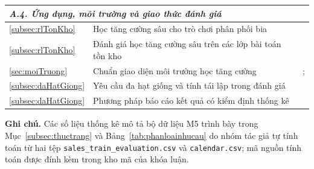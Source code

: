 \begin{longtable}{|p{}|p{}|p{}|}
\multicolumn{3}{l}{\textit{A.4. Ứng dụng, môi trường và giao thức đánh giá}} \\
\hline
\ref{subsec:rlTonKho} & Học tăng cường sâu cho trò chơi phân phối bia &
\textcite{oroojlooyjadid2022} \\

\ref{subsec:rlTonKho} & Đánh giá học tăng cường sâu trên các lớp bài toán tồn kho &
\textcite{gijsbrechts2022} \\

\ref{sec:moiTruong} & Chuẩn giao diện môi trường học tăng cường &
\textcite{brockman2016gym}; \textcite{towers2024gymnasium} \\

\ref{subsec:daHatGiong} & Yêu cầu đa hạt giống và tính tái lập trong đánh giá &
\textcite{henderson2018} \\

\ref{subsec:daHatGiong} & Phương pháp báo cáo kết quả có kiểm định thống kê &
\textcite{agarwal2021} \\
\hline
\end{longtable}

\vspace{0.5\baselineskip}
\noindent\textbf{Ghi chú.} Các số liệu thống kê mô tả bộ dữ liệu M5 trình bày
trong Mục~\ref{subsec:thuctrang} và Bảng~\ref{tab:phanloainhucau} do nhóm tác
giả tự tính toán từ hai tệp \texttt{sales\_train\_evaluation.csv} và
\texttt{calendar.csv}; mã nguồn tính toán được đính kèm trong kho mã của khóa
luận.
